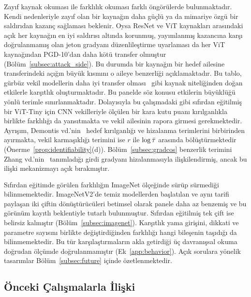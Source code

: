 Zayıf kaynak okuması ile farklılık okuması farklı öngörülerde bulunmaktadır. Kendi nedenleriyle zayıf olan bir kaynağın daha güçlü ya da mimariye özgü bir saldırıdan kazanç sağlaması beklenir. Oysa ResNet ve ViT kaynakları arasındaki açık her kaynağın en iyi saldırısı altında korunmuş, yayımlanmış kazancına karşı doğrulanmamış olan jeton gradyanı düzenlileştirme uyarlaması da her ViT kaynağından PGD-10'dan daha kötü transfer olmuştur (Bölüm~\ref{subsec:attack_side}). Bu durumda bir kaynağın bir hedef ailesine transferindeki açığın büyük kısmını o aileye benzerliği açıklamaktadır. Bu tablo, gürbüz vekil modellerin daha iyi transfer olması~\cite{awad2025defense} gibi kaynak niteliğinden doğan etkilerle karşıtlık oluşturmaktadır. Bu panelde söz konusu etkilerin büyüklüğü yönlü terimle sınırlanmaktadır. Dolayısıyla bu çalışmadaki gibi sıfırdan eğitilmiş bir ViT-Tiny için CNN vekilleriyle ölçülen bir kara kutu puanı kırılganlıkla birlikte farklılığı da yansıtmakta ve vekil ailesinin rapora girmesi gerekmektedir. Ayrışım, Demontis vd.'nin~\cite{demontis2019adversarial} hedef kırılganlığı ve hizalanma terimlerini birbirinden ayırmakta, vekil karmaşıklığı terimini ise $r$ ile $\log\bar{\tau}$ arasında bölüştürmektedir (Önerme~\ref{prop:identifiability}(d)). Bölüm~\ref{subsec:gradcos} benzerlik terimini Zhang vd.'nin~\cite{zhang2024why} tanımladığı girdi gradyanı hizalanmasıyla ilişkilendirmiş, ancak bu ilişki mekanizmayı açık bırakmıştır.

Sıfırdan eğitimde görülen farklılığın ImageNet ölçeğinde sürüp sürmediği bilinmemektedir. ImageNetV2'de temiz modellerden başlatılan ve aynı tarifi paylaşan iki çiftin dönüştürücüleri betimsel olarak panele daha az benzemiş ve bu görünüm kayıtlı beklentiyle tutarlı bulunmuştur. Sıfırdan eğitilmiş tek çift ise belirsiz kalmıştır (Bölüm~\ref{subsec:imagenet}). Karşıtlık yama girişini, dikkati ve parametre sayısını birlikte değiştirdiğinden farklılığı hangi bileşenin taşıdığı da bilinmemektedir. Bu tür karşılaştırmaların akla getirdiği üç davranışsal okuma doğrudan ölçümde doğrulanmamıştır (Ek~\ref{app:behavior}). Açık sorulara yönelik tasarımlar Bölüm~\ref{subsec:future} içinde özetlenmektedir.

\subsection{Önceki Çalışmalarla İlişki}
\label{subsec:prior}

